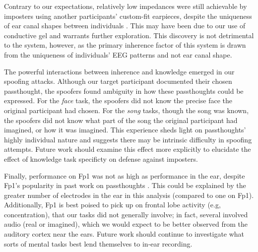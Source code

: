 \documentclass{sigchi}
\begin{document}
Contrary to our expectations, relatively low impedances were still achievable by imposters using another participants' custom-fit earpieces, despite the uniqueness of ear canal shapes between individuals \cite{Akkermans2005}. This may have been due to our use of conductive gel and warrants further exploration. This discovery is not detrimental to the system, however, as the primary inherence factor of this system is drawn from the uniqueness of individuals' EEG patterns and not ear canal shape.

The powerful interactions between inherence and knowledge emerged in our spoofing attacks. Although our target participant documented their chosen passthought, the spoofers found ambiguity in how these passthoughts could be expressed. For the \textit{face} task, the spoofers did not know the precise face the original participant had chosen. For the \textit{song} tasks, though the song was known, the spoofers did not know what part of the song the original participant had imagined, or how it was imagined. This experience sheds light on passthoughts' highly individual nature and suggests there may be intrinsic difficulty in spoofing attempts. Future work should examine this effect more explicitly to elucidate the effect of knowledge task specificty on defense against imposters.

Finally, performance on Fp1 was not as high as performance in the ear, despite Fp1's popularity in past work on passthoughts \cite{Chuang2013b}. This could be explained by the greater number of electrodes in the ear in this analysis (compared to one on Fp1). Additionally, Fp1 is best poised to pick up on frontal lobe activity (e.g, concentration), that our tasks did not generally involve; in fact, several involved audio (real or imagined), which we would expect to be better observed from the auditory cortex near the ears. Future work should continue to investigate what sorts of mental tasks best lend themselves to in-ear recording.
\end{document}
